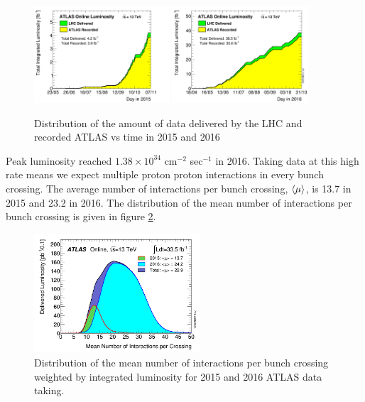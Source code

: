 \begin{figure}[htb]
  \begin{center}
    \includegraphics[width=0.45\textwidth]{figures/Data/IntLumi2015.png}\hspace{0.05\textwidth}
    \includegraphics[width=0.45\textwidth]{figures/Data/IntLumi2016.png}\hspace{0.05\textwidth}
\end{center}
\caption{Distribution of the amount of data delivered by the LHC and recorded ATLAS vs time in 2015 and 2016  }
\label{fig:data2015-2016} 
\end{figure}

\indent Peak luminosity reached $1.38 \times 10^{34}$  cm$^{-2}$ sec$^{-1}$ in 2016.  Taking data at this high rate means we expect multiple proton proton interactions in every bunch crossing.  The average number of interactions per bunch crossing, $\braket{\mu}$, is 13.7 in 2015 and 23.2 in 2016.  The distribution of the mean number of interactions per bunch crossing is given in figure \ref{fig:nVtx}.   \\

\begin{figure}[htb]
  \begin{center}
    \includegraphics[width=0.55\textwidth]{figures/Data/mu_2015_2016_LHCC.png}\hspace{0.05\textwidth}
\end{center}
\caption{Distribution of the mean number of interactions per bunch crossing weighted by integrated luminosity for 2015 and 2016 ATLAS data taking.    }
\label{fig:nVtx} 
\end{figure}

